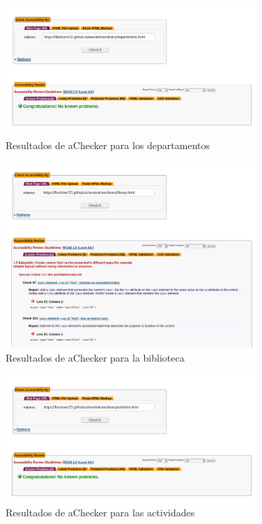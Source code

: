 \documentclass[11pt]{article}
\begin{document}
\begin{figure}[h]
    \centering
    \includegraphics[width=0.85\textwidth]{achecker2.png}
    \caption{Resultados de aChecker para los departamentos}
\end{figure}

\begin{figure}[h]
    \centering
    \includegraphics[width=0.85\textwidth]{achecker3.png}
    \caption{Resultados de aChecker para la biblioteca}
\end{figure}

\begin{figure}[h]
    \centering
    \includegraphics[width=0.85\textwidth]{achecker4.png}
    \caption{Resultados de aChecker para las actividades}
\end{figure}
\end{document}

